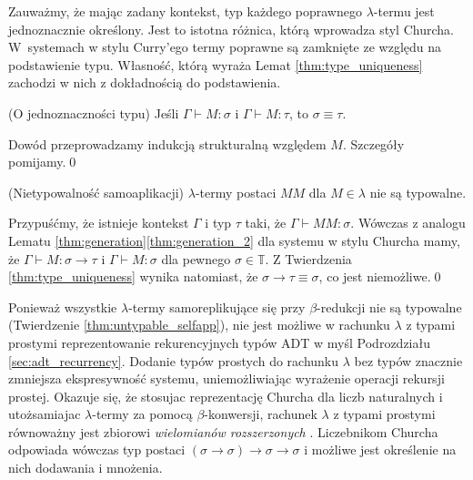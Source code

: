 Zauważmy, że mając zadany kontekst, typ każdego poprawnego \(\lambda\)-termu jest jednoznacznie określony. Jest to istotna różnica, którą wprowadza styl Churcha. W~systemach w stylu Curry'ego termy poprawne są zamknięte ze względu na podstawienie typu. Własność, którą wyraża Lemat \ref{thm:type_uniqueness} zachodzi w nich z dokładnością do podstawienia. 

\begin{lemat}(O jednoznaczności typu)\label{thm:type_uniqueness}
  Jeśli \(\Gamma\vdash M:\sigma\) i \(\Gamma\vdash M:\tau\), to \(\sigma\equiv \tau\).
\end{lemat}
\begin{dowod}
  Dowód przeprowadzamy indukcją strukturalną względem \(M\). Szczegóły pomijamy.\qed
\end{dowod}

\begin{twierdzenie}\label{thm:untypable_selfapp}(Nietypowalność samoaplikacji)
  \(\lambda\)-termy postaci \(MM\) dla \(M\in\mathbb{\lambda}\) nie są typowalne.
\end{twierdzenie}
\begin{dowod}
  Przypuśćmy, że istnieje kontekst \(\Gamma\) i typ \(\tau\) taki, że \(\Gamma\vdash MM:\sigma\).
  Wówczas z analogu Lematu \ref{thm:generation}\ref{thm:generation_2} dla systemu w stylu Churcha mamy, że
  \(\Gamma\vdash M:\sigma\to\tau\) i \(\Gamma\vdash M:\sigma\) dla pewnego \(\sigma\in\mathbb{T}\).
  Z Twierdzenia \ref{thm:type_uniqueness} wynika natomiast, że \(\sigma\to\tau\equiv \sigma\),
  co jest niemożliwe.\qed
\end{dowod}

\begin{uwaga*}
  Ponieważ wszystkie \(\lambda\)-termy samoreplikujące się przy \(\beta\)-redukcji nie są typowalne (Twierdzenie \ref{thm:untypable_selfapp}), nie jest możliwe  w rachunku \(\lambda\) z typami prostymi reprezentowanie rekurencyjnych typów ADT w myśl Podrozdziału \ref{sec:adt_recurrency}. Dodanie typów prostych do rachunku \(\lambda\) bez typów znacznie zmniejsza ekspresywność systemu, uniemożliwiając wyrażenie operacji rekursji prostej. Okazuje się, że stosujac reprezentację Churcha dla liczb naturalnych i utożsamiajac \(\lambda\)-termy za pomocą \(\beta\)-konwersji, rachunek \(\lambda\) z typami prostymi równoważny jest zbiorowi \emph{wielomianów rozszerzonych} \cite{DBLP:journals/corr/abs-cs-0701022}. Liczebnikom Churcha odpowiada wówczas typ postaci \((\sigma\to\sigma)\to\sigma\to\sigma\) i możliwe jest określenie na nich dodawania i mnożenia.
\end{uwaga*}

